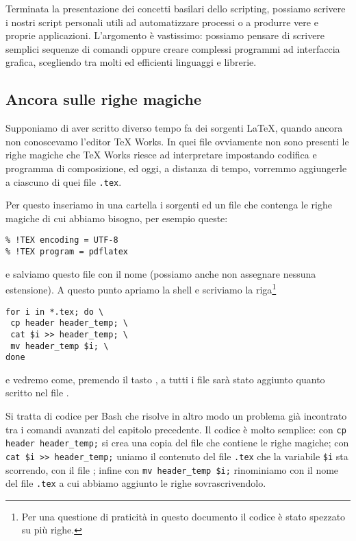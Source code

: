Terminata la presentazione dei concetti basilari dello scripting, possiamo
scrivere i nostri script personali utili ad automatizzare processi o a produrre
vere e proprie applicazioni. L'argomento è vastissimo: possiamo pensare di
scrivere semplici sequenze di comandi oppure creare complessi programmi ad
interfaccia grafica, scegliendo tra molti ed efficienti linguaggi e librerie.

\subsection{Ancora sulle righe magiche}
\label{sssec:addheader}

Supponiamo di aver scritto diverso tempo fa dei sorgenti \LaTeX, quando ancora
non conoscevamo l'editor TeX Works. In quei file ovviamente non sono presenti le
righe magiche che TeX Works riesce ad interpretare impostando codifica e
programma di composizione, ed oggi, a distanza di tempo, vorremmo aggiungerle a
ciascuno di quei file \texttt{.tex}.

Per questo inseriamo in una cartella i sorgenti ed un file che contenga le
righe magiche di cui abbiamo bisogno, per esempio queste:
\begin{Verbatim}
% !TEX encoding = UTF-8
% !TEX program = pdflatex
\end{Verbatim}
e salviamo questo file con il nome  (possiamo anche non
assegnare nessuna estensione). A questo punto apriamo la shell e scriviamo la
riga\footnote{Per una questione di praticità in questo documento il codice è
stato spezzato su più righe.}
\begin{Verbatim}
for i in *.tex; do \
 cp header header_temp; \
 cat $i >> header_temp; \
 mv header_temp $i; \
done
\end{Verbatim}
e vedremo come, premendo il tasto \keys{\return}, a tutti i file sarà stato
aggiunto quanto scritto nel file .

Si tratta di codice per Bash che risolve in altro modo un problema già
incontrato tra i comandi avanzati del capitolo precedente. Il codice è molto
semplice: con \verb!cp header header_temp;! si crea una copia del file che
contiene le righe magiche; con \verb!cat $i >> header_temp;! uniamo il
contenuto del file \texttt{.tex} che la variabile \verb!$i! sta
scorrendo, con il file \filestyle{header\_temp}; infine con
\verb!mv header_temp $i;! rinominiamo \filestyle{header\_temp} con il nome del
file \texttt{.tex} a cui abbiamo aggiunto le righe sovrascrivendolo.

